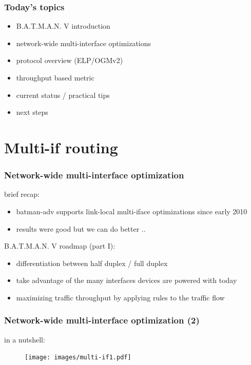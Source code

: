 \documentclass[slidestop]{beamer}
\begin{document}
\begin{frame}[c]
	\frametitle{Today's topics}
	\begin{itemize}
		\item B.A.T.M.A.N. V introduction
		\item network-wide multi-interface optimizations
		\item protocol overview (ELP/OGMv2)
		\item throughput based metric
		\item current status / practical tips
		\item next steps
	\end{itemize}
\end{frame}

\section{Multi-if routing}
\begin{frame}[c]
	\frametitle{Network-wide multi-interface optimization}

	brief recap:

	\begin{itemize}
		\item batman-adv supports link-local multi-iface optimizations since early 2010
		\item results were good but we can do better ..
	\end{itemize}

	\addvspace{1.0cm}

	B.A.T.M.A.N. V roadmap (part I):

	\begin{itemize}
		\item differentiation between half duplex / full duplex
		\item take advantage of the many interfaces devices are powered with today
		\item maximizing traffic throughput by applying rules to the traffic flow
	\end{itemize}
\end{frame}

\begin{frame}[c]
	\frametitle{Network-wide multi-interface optimization (2)}

	in a nutshell:
	\begin{figure}
		\centering
		\texttt{[image: images/multi-if1.pdf]}
	\end{figure}
\end{frame}
\end{document}
